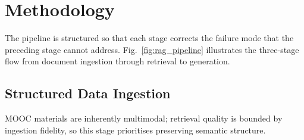 \documentclass[runningheads]{llncs}
\begin{document}
\section{Methodology}
\label{ppmethod}

The pipeline is structured so that each stage corrects the failure mode that the preceding stage cannot address. Fig.~\ref{fig:rag_pipeline} illustrates the three-stage flow from document ingestion through retrieval to generation.

\subsection{Structured Data Ingestion}
\label{sec:ingestion}

MOOC materials are inherently multimodal; retrieval quality is bounded by ingestion fidelity, so this stage prioritises preserving semantic structure.
\end{document}
